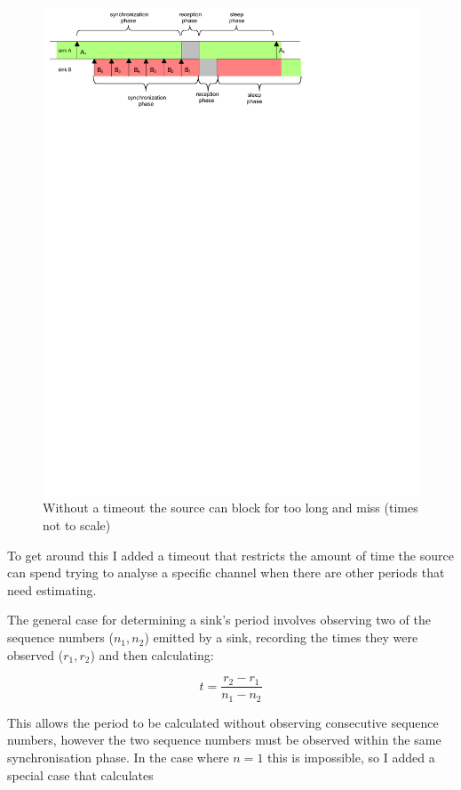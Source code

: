 \documentclass{article}
\begin{document}
\begin{figure}[h]
\includegraphics[trim=1cm 22cm 1cm 1cm]{embs-blocking}
\caption{Without a timeout the source can block for too long and miss (times not to scale)}
\label{fig:long-blocking}
\end{figure}

To get around this I added a timeout that restricts the amount of time the source can spend trying to analyse a specific
channel when there are other periods that need estimating.

The general case for determining a sink's period involves observing two of the sequence numbers ($n_1, n_2$) emitted by a sink,
recording the times they were observed ($r_1, r_2$) and then calculating:

$$t = \frac{r_2 - r_1} {n_1 - n_2}$$

This allows the period to be calculated without observing consecutive sequence numbers, however the two
sequence numbers must be observed within the same synchronisation phase. In the case where $n=1$ this is impossible,
so I added a special case that calculates
\end{document}
